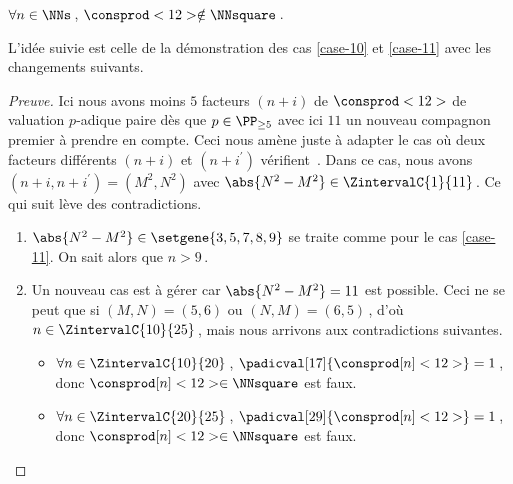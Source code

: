 \begin{fact} \label{case-12}
	 $\forall n \in \NNs$\,, $\consprod<12> \notin \NNsquare$\,.
\end{fact}




L'idée suivie est celle de la démonstration des cas \ref{case-10} et \ref{case-11} avec les changements suivants.


\begin{proof}[Preuve]%
    Ici nous avons moins $5$ facteurs $(n + i)$ de $\consprod<12>$ de valuation $p$-adique paire dès que $p \in \PP_{\geq 5}$ avec ici $11$ un nouveau compagnon premier à prendre en compte.
    Ceci nous amène juste à adapter le cas où deux facteurs différents $(n+i)$ et $(n+i^\prime)$ vérifient \,.
    Dans ce cas, nous avons $(n+i, n+i^\prime) = (M^2, N^2)$ avec $\abs{N^2 - M^2} \in \ZintervalC{1}{11}$\,. Ce qui suit lève des contradictions.
	\begin{enumerate}
		\item $\abs{N^2 - M^2} \in \setgene{3, 5, 7, 8, 9}$ se traite comme pour le cas \ref{case-11}. On sait alors que $n > 9$\,.

			
		\item Un nouveau cas est à gérer car $\abs{N^2 - M^2} = 11$ est possible.
		Ceci ne se peut que si $(M, N) = (5, 6)$ ou $(N, M) = (6, 5)$\,, d'où $n \in \ZintervalC{10}{25}$\,, mais nous arrivons aux contradictions suivantes.
		\begin{itemize}
			\item $\forall n \in \ZintervalC{10}{20}$\,, 
			$\padicval[17]{\consprod[n]<12>} = 1$\,, donc $\consprod[n]<12> \in \NNsquare$ est faux.

			\item $\forall n \in \ZintervalC{20}{25}$\,, 
			$\padicval[29]{\consprod[n]<12>} = 1$\,, donc $\consprod[n]<12> \in \NNsquare$ est faux.
		\qedhere
		\end{itemize}
	\end{enumerate}
\end{proof}

